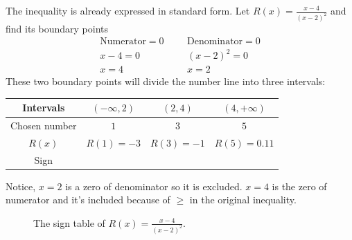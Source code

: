 The inequality is already expressed in standard form. Let $R(x)=\frac{x-4}{(x-2)^2}$ and find its boundary points
\begin{align*}
        \text{Numerator}=0&       &       &\text{Denominator}=0 \\
        x-4 =0&                     &       &(x-2)^2=0\\
        x=4&                        &       &x=2
\end{align*} 
These two boundary points will divide the number line into three intervals:
\begin{table}[ht]
\centering
\begin{tabular}{c || c  c  c }
    \toprule
    Intervals     & $(-\infty,2)$   & $(2,4)$  & $(4,+\infty)$\\[1.5pt]
    \hline \hline
    Chosen number & $1$         &  $3$      &   $5$\\
    $R(x)$        & $R(1)=-3$  & $R(3)=-1$ & $R(5)=0.11$\\[1.5pt]
    Sign          &\circled{$-$} &\circled{$-$}&\circled{$+$}
\end{tabular}
\end{table}
%

Notice, $x=2$ is a zero of denominator so it is excluded. $x=4$ is the zero of numerator and it's included because of $\ge$ in the original inequality.
%
\begin{figure}[ht]   
    \centering
    \caption{The sign table of $R(x)=\frac{x-4}{(x-2)^2}$.}
\end{figure}
%


